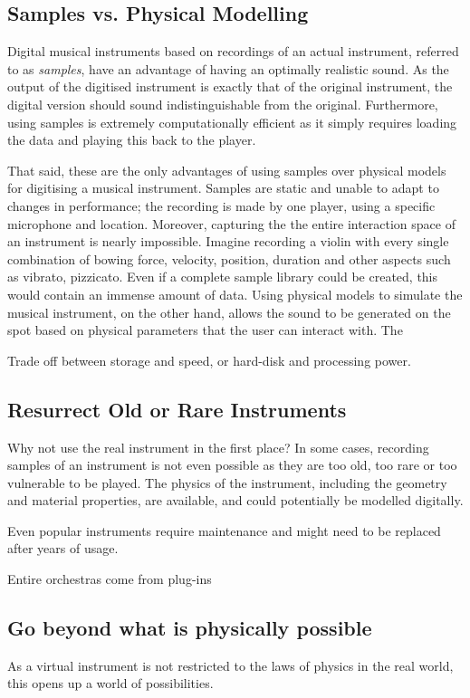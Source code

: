 \subsection{Samples vs. Physical Modelling}
Digital musical instruments based on recordings of an actual instrument, referred to as \textit{samples}, have an advantage of having an optimally realistic sound. As the output of the digitised instrument is exactly that of the original instrument, the digital version should sound indistinguishable from the original. Furthermore, using samples is extremely computationally efficient as it simply requires loading the data and playing this back to the player.

That said, these are the only advantages of using samples over physical models for digitising a musical instrument. Samples are static and unable to adapt to changes in performance; the recording is made by one player, using a specific microphone and location. Moreover, capturing the the entire interaction space of an instrument is nearly impossible. Imagine recording a violin with every single combination of bowing force, velocity, position, duration and other aspects such as vibrato, pizzicato. Even if a complete sample library could be created, this would contain an immense amount of data. Using physical models to simulate the musical instrument, on the other hand, allows the sound to be generated on the spot based on physical parameters that the user can interact with. The 

Trade off between storage and speed, or hard-disk and processing power.


\subsection{Resurrect Old or Rare Instruments}
Why not use the real instrument in the first place? 
In some cases, recording samples of an instrument is not even possible as they are too old, too rare or too vulnerable to be played. The physics of the instrument, including the geometry and material properties, are available, and could potentially be modelled digitally. 


Even popular instruments require maintenance and might need to be replaced after years of usage. 

Entire orchestras come from plug-ins


\subsection{Go beyond what is physically possible} 
As a virtual instrument is not restricted to the laws of physics in the real world, this opens up a world of possibilities.

